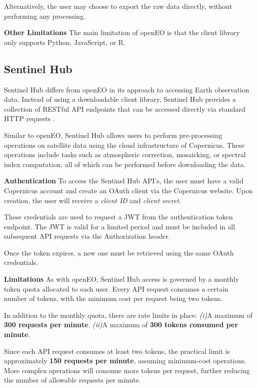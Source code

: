 Alternatively, the user may choose to export the raw data directly, without performing any processing.


\textbf{Other Limitations}
The main limitation of openEO is that the client library only supports Python, JavaScript, or R.

\subsection{Sentinel Hub}
Sentinel Hub differs from openEO in its approach to accessing Earth observation data. Instead of using a downloadable client library, Sentinel Hub provides a collection of RESTful API endpoints that can be accessed directly via standard HTTP requests \cite{copernicusSentinelx2013}.

Similar to openEO, Sentinel Hub allows users to perform pre-processing operations on satellite data using the cloud infrastructure of Copernicus. These operations include tasks such as atmospheric correction, mosaicking, or spectral index computation, all of which can be performed before downloading the data.

\textbf{Authentication}
To access the Sentinel Hub API's, the user must have a valid Copernicus account and create an OAuth client via the Copernicus website. Upon creation, the user will receive a \textit{client ID} and \textit{client secret}.

These credentials are used to request a \acrfull{JWT} from the authentication token endpoint. The JWT is valid for a limited period and must be included in all subsequent API requests via the Authorization header.

Once the token expires, a new one must be retrieved using the same OAuth credentials.

\textbf{Limitations}
As with openEO, Sentinel Hub access is governed by a monthly token quota allocated to each user. Every API request consumes a certain number of tokens, with the minimum cost per request being two tokens.

In addition to the monthly quota, there are rate limits in place: \textit{(i)}A maximum of \textbf{300 requests per minute}.
\textit{(ii)}A maximum of \textbf{300 tokens consumed per minute}.

Since each API request consumes at least two tokens, the practical limit is approximately \textbf{150 requests per minute}, assuming minimum-cost operations. More complex operations will consume more tokens per request, further reducing the number of allowable requests per minute.

